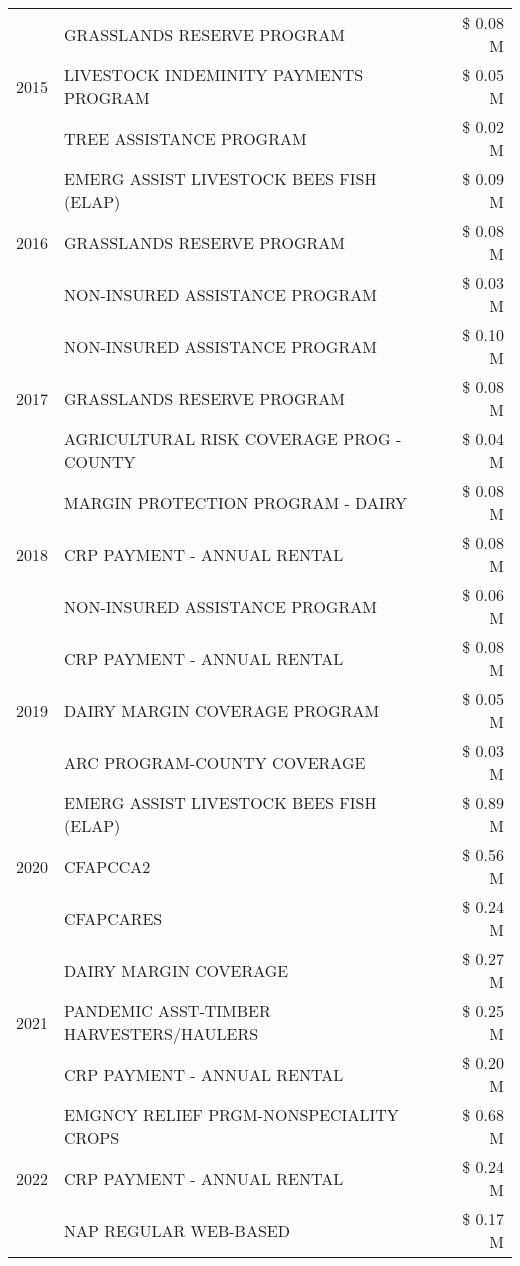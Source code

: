 \begin{tabular}{llr}
\cline{1-3}
\multirow[t]{3}{*}{2015} & GRASSLANDS RESERVE PROGRAM & \$ 0.08 M \\
 & LIVESTOCK INDEMINITY PAYMENTS PROGRAM & \$ 0.05 M \\
 & TREE ASSISTANCE PROGRAM & \$ 0.02 M \\
\cline{1-3}
\multirow[t]{3}{*}{2016} & EMERG ASSIST LIVESTOCK BEES FISH (ELAP) & \$ 0.09 M \\
 & GRASSLANDS RESERVE PROGRAM & \$ 0.08 M \\
 & NON-INSURED ASSISTANCE PROGRAM & \$ 0.03 M \\
\cline{1-3}
\multirow[t]{3}{*}{2017} & NON-INSURED ASSISTANCE PROGRAM & \$ 0.10 M \\
 & GRASSLANDS RESERVE PROGRAM & \$ 0.08 M \\
 & AGRICULTURAL RISK COVERAGE PROG - COUNTY & \$ 0.04 M \\
\cline{1-3}
\multirow[t]{3}{*}{2018} & MARGIN PROTECTION PROGRAM - DAIRY & \$ 0.08 M \\
 & CRP PAYMENT - ANNUAL RENTAL & \$ 0.08 M \\
 & NON-INSURED ASSISTANCE PROGRAM & \$ 0.06 M \\
\cline{1-3}
\multirow[t]{3}{*}{2019} & CRP PAYMENT - ANNUAL RENTAL & \$ 0.08 M \\
 & DAIRY MARGIN COVERAGE PROGRAM & \$ 0.05 M \\
 & ARC PROGRAM-COUNTY COVERAGE & \$ 0.03 M \\
\cline{1-3}
\multirow[t]{3}{*}{2020} & EMERG ASSIST LIVESTOCK BEES FISH (ELAP) & \$ 0.89 M \\
 & CFAPCCA2 & \$ 0.56 M \\
 & CFAPCARES & \$ 0.24 M \\
\cline{1-3}
\multirow[t]{3}{*}{2021} & DAIRY MARGIN COVERAGE & \$ 0.27 M \\
 & PANDEMIC ASST-TIMBER HARVESTERS/HAULERS & \$ 0.25 M \\
 & CRP PAYMENT - ANNUAL RENTAL & \$ 0.20 M \\
\cline{1-3}
\multirow[t]{3}{*}{2022} & EMGNCY RELIEF PRGM-NONSPECIALITY CROPS & \$ 0.68 M \\
 & CRP PAYMENT - ANNUAL RENTAL & \$ 0.24 M \\
 & NAP REGULAR WEB-BASED & \$ 0.17 M \\
\cline{1-3}
\bottomrule
\end{tabular}
